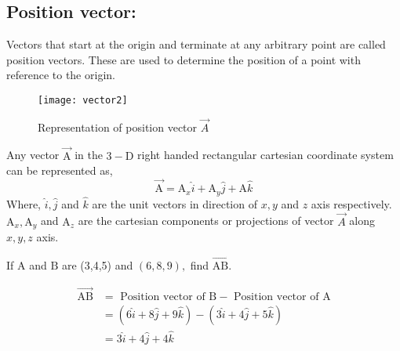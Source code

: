 \subsection{Position vector:} 
\begin{definition}
	Vectors that start at the origin and terminate at any arbitrary point are called position vectors. These are used to determine the position of a point with reference to the origin.
\end{definition}
\begin{figure}[H]
	\centering
	\texttt{[image: vector2]}
	\caption{Representation of position vector $\vec{A }$}
\end{figure}
 Any vector $\vec{\mathrm A}$ in the $3-\mathrm{\mathrm D}$ right handed rectangular cartesian coordinate system can be represented as,
 \begin{equation}
\vec{\mathrm A}=\mathrm A_{x} \hat{i}+\mathrm A_{y} \hat{j}+\mathrm A \hat{k}
 \end{equation} 
Where, $\hat{i}, \hat{j}$ and $\hat{k}$ are the unit vectors in direction of $x, y$ and $z$ axis respectively. $\mathrm A_{x}, \mathrm A_{y} $ and $ \mathrm A_{z}$ are the
cartesian components or projections of vector $\vec{A}$ along $x, y, z$ axis.
 \begin{exercise}
	 If $\mathrm A$ and $\mathrm B$ are (3,4,5) and $(6,8,9),$ find $\vec {\mathrm {A B}}$.
	\end{exercise}
\begin{answer}
$$\begin{aligned} \overrightarrow{\mathrm {A B}} &=\text { Position vector of } \mathrm B-\text { Position vector of } \mathrm A \\ &=(6 \hat{i}+8 \hat{j}+9 \hat{k})-(3 \hat{i}+4 \hat{j}+5 \hat{k}) \\ &=3 \hat{i}+4 \hat{j}+4 \hat{k} \end{aligned}$$
\end{answer}

